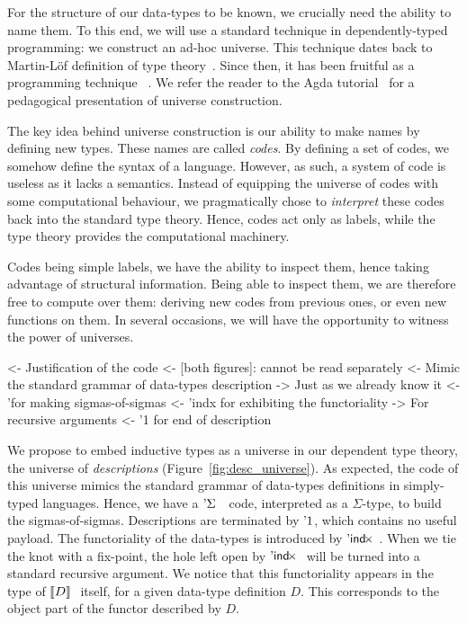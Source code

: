 For the structure of our data-types to be known, we crucially need the
ability to name them.  To this
end, we will use a standard technique in dependently-typed programming: we
construct an ad-hoc universe. This technique dates back to Martin-L\"of
definition of type theory~\cite{martin-lof:itt}. Since then, it has been
fruitful as a programming 
technique~\cite{benke:universe-generic-prog,whoelse?}
. 
We refer the reader to the Agda tutorial~\cite{norell:agda-tutorial} for a
pedagogical presentation of universe construction. 


The key idea behind universe construction is our ability to make names
by defining new types. These names are called \emph{codes}. By
defining a set of codes, we somehow define the syntax of a
language. However, as such, a system of code is useless as it lacks a
semantics. Instead of equipping the universe of codes with some
computational behaviour, we pragmatically chose to \emph{interpret}
these codes back into the standard type theory. Hence, codes act only
as labels, while the type theory provides the computational
machinery. 

Codes being simple labels, we have the ability to inspect them, hence
taking advantage of structural information. Being able to inspect
them, we are therefore free to compute over them: deriving new codes
from previous ones, or even new functions on them. In several
occasions, we will have the opportunity to witness the power of
universes.

\begin{wstructure}
<- Justification of the code 
    <- [both figures]: cannot be read separately
    <- Mimic the standard grammar of data-types description
        -> Just as we already know it
        <- '\Sigma for making sigmas-of-sigmas
        <- 'indx for exhibiting the functoriality
            -> For recursive arguments
        <- '1 for end of description
\end{wstructure}

We propose to embed inductive types as a universe in our dependent
type theory, the universe of \emph{descriptions}
(Figure~\ref{fig:desc_universe}). As expected, the code of this
universe mimics the standard grammar of data-types definitions in
simply-typed languages. Hence, we have a $\DSigma{}{}$ code,
interpreted as a $\Sigma$-type, to build the
sigmas-of-sigmas. Descriptions are terminated by $\DUnit$, which
contains no useful payload. The functoriality of the data-types is
introduced by $\DIndx$. When we tie the knot with a fix-point, the
hole left open by $\DIndx$ will be turned into a standard recursive
argument. We notice that this functoriality appears in the type of
$\descop{D}{}$ itself, for a given data-type definition $D$. This
corresponds to the object part of the functor described by $D$.

